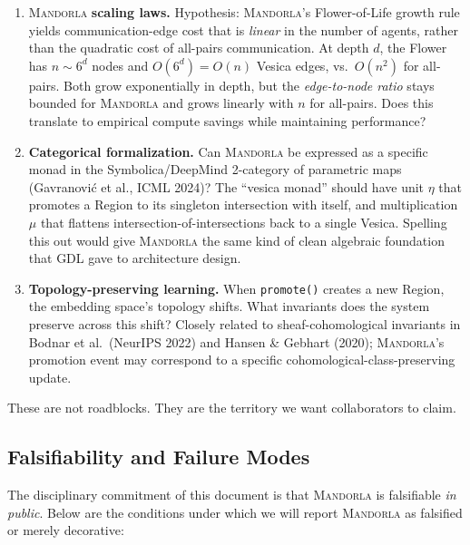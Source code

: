 \documentclass[11pt,a4paper]{article}
\begin{document}
\begin{enumerate}[leftmargin=*]
  \item \textsc{Mandorla} \textbf{scaling laws.} Hypothesis: \textsc{Mandorla}'s Flower-of-Life growth rule yields communication-edge cost that is \emph{linear} in the number of agents, rather than the quadratic cost of all-pairs communication. At depth $d$, the Flower has $n \sim 6^d$ nodes and $O(6^d) = O(n)$ Vesica edges, vs.\ $O(n^2)$ for all-pairs. Both grow exponentially in depth, but the \emph{edge-to-node ratio} stays bounded for \textsc{Mandorla} and grows linearly with $n$ for all-pairs. Does this translate to empirical compute savings while maintaining performance?
  \item \textbf{Categorical formalization.} Can \textsc{Mandorla} be expressed as a specific monad in the Symbolica/DeepMind 2-category of parametric maps (Gavranovi\'c et al., ICML 2024)? The ``vesica monad'' should have unit $\eta$ that promotes a Region to its singleton intersection with itself, and multiplication $\mu$ that flattens intersection-of-intersections back to a single Vesica. Spelling this out would give \textsc{Mandorla} the same kind of clean algebraic foundation that GDL gave to architecture design.
  \item \textbf{Topology-preserving learning.} When \texttt{promote()} creates a new Region, the embedding space's topology shifts. What invariants does the system preserve across this shift? Closely related to sheaf-cohomological invariants in Bodnar et al.\ (NeurIPS 2022) and Hansen \& Gebhart (2020); \textsc{Mandorla}'s promotion event may correspond to a specific cohomological-class-preserving update.
\end{enumerate}

These are not roadblocks. They are the territory we want collaborators to claim.

\subsection{Falsifiability and Failure Modes}

The disciplinary commitment of this document is that \textsc{Mandorla} is falsifiable \emph{in public}. Below are the conditions under which we will report \textsc{Mandorla} as falsified or merely decorative:
\end{document}
